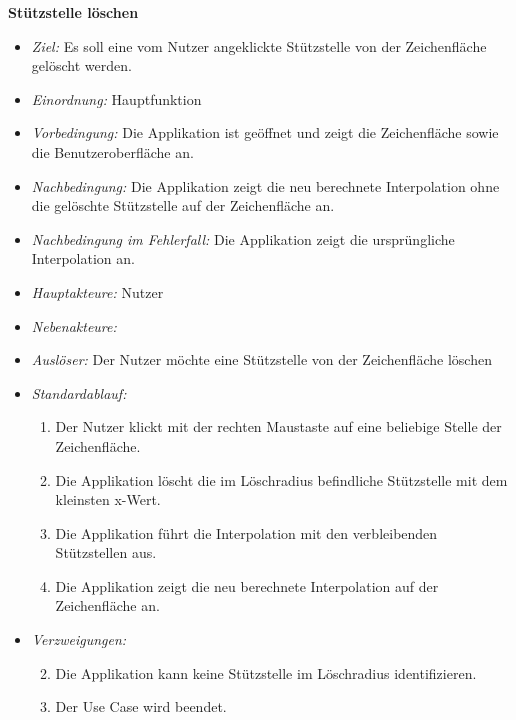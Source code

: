 \textbf{St\"utzstelle l\"oschen}
  \begin{itemize}
  \item \textit{Ziel:} Es soll eine vom Nutzer angeklickte St\"utzstelle von der Zeichenfl\"ache gel\"oscht werden.
  \item \textit{Einordnung:} Hauptfunktion
  \item \textit{Vorbedingung:} Die Applikation ist ge\"offnet und zeigt die Zeichenfl\"ache sowie die Benutzeroberfl\"ache an.
  \item \textit{Nachbedingung:} Die Applikation zeigt die neu berechnete Interpolation ohne die gel\"oschte St\"utzstelle auf der Zeichenfl\"ache an.
  \item \textit{Nachbedingung im Fehlerfall:}  Die Applikation zeigt die urspr\"ungliche Interpolation an.
  \item \textit{Hauptakteure:} Nutzer
  \item \textit{Nebenakteure:} 
  \item \textit{Ausl\"oser:} Der Nutzer m\"ochte eine St\"utzstelle von der Zeichenfl\"ache l\"oschen
  \item \textit{Standardablauf:}
    \begin{enumerate}[label=(\arabic*)]
    \item Der Nutzer klickt mit der rechten Maustaste auf eine beliebige Stelle der Zeichenfl\"ache.
    \item Die Applikation l\"oscht die im L\"oschradius befindliche St\"utzstelle mit dem kleinsten x-Wert.
    \item Die Applikation f\"uhrt die Interpolation mit den verbleibenden St\"utzstellen aus.
    \item Die Applikation zeigt die neu berechnete Interpolation auf der Zeichenfl\"ache an.
   
    \end{enumerate}
  \item \textit{Verzweigungen:}
    \begin{enumerate}[label=(\arabic*a)]
    \setcounter{enumii}{1}
      \item Die Applikation kann keine St\"utzstelle im L\"oschradius identifizieren.
      \item Der Use Case wird beendet.
      \end{enumerate}

 \end{itemize}
